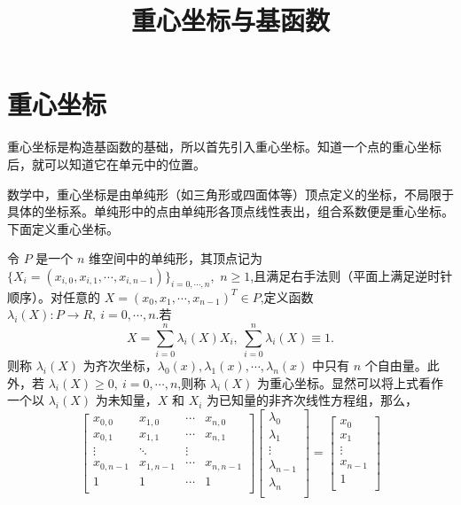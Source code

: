 \documentclass[12pt,a4paper]{article}
\title{重心坐标与基函数}
\author{}
\date{\chntoday}
\begin{document}
\maketitle

\section{重心坐标}
重心坐标是构造基函数的基础，所以首先引入重心坐标。知道一个点的重心坐标后，就可以知道它在单元中的位置。

数学中，重心坐标是由单纯形（如三角形或四面体等）顶点定义的坐标，不局限于具体的坐标系。单纯形中的点由单纯形各顶点线性表出，组合系数便是重心坐标。下面定义重心坐标。

令 $P$ 是一个 $n$ 维空间中的单纯形，其顶点记为 $\lbrace X_i=(x_{i,0},x_{i,1},\cdots ,x_{i,n-1})\rbrace_{i=0,\cdots,n}$,~$n\ge 1$,且满足右手法则（平面上满足逆时针顺序）。对任意的 $X=(x_0 ,x_1,\cdots ,x_{n-1})^T\in P$,定义函数 $\lambda _i(X):P\longrightarrow R,~i=0,\cdots,n$.若
$$
X=\sum_{i=0}^n \lambda _i(X)X_i,~\sum_{i=0}^n\lambda _i(X)\equiv 1.
$$
则称 $\lambda _i(X)$ 为齐次坐标，$\lambda _0(x),\lambda _1(x),\cdots,\lambda _n(x)$ 中只有 $n$ 个自由量。此外，若 $\lambda _i(X)\ge 0,~i=0,\cdots,n$,则称 $\lambda _i(X)$ 为重心坐标。显然可以将上式看作一个以 $\lambda _i(X)$ 为未知量，$X$ 和 $X_i$ 为已知量的非齐次线性方程组，那么，
$$\begin{bmatrix}
x_{0,0} & x_{1,0} & \cdots & x_{n,0}\\
x_{0,1} & x_{1,1} & \cdots & x_{n,1}\\
\vdots & \ddots & \vdots \\
x_{0,n-1} & x_{1,n-1} & \cdots & x_{n,n-1}\\
1 & 1 & \cdots & 1\\
\end{bmatrix}
\begin{bmatrix}
\lambda _0 \\
\lambda _1 \\
\vdots \\
\lambda _{n-1} \\
\lambda _n \\
\end{bmatrix}=
\begin{bmatrix}
x _0 \\
x _1 \\
\vdots \\
x _{n-1} \\
1 \\
\end{bmatrix}$$
\end{document}
